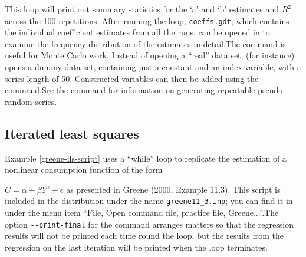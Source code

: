 This loop will print out summary statistics for the `a'
	and `b' estimates and $R^2$ across the 100 repetitions.
	After running the loop, \verb+coeffs.gdt+, which
	contains the individual coefficient estimates from all the
	runs, can be opened in  to
	examine the frequency distribution of the estimates in
	detail.The command  is useful for
	Monte Carlo work.  Instead of opening a ``real''
	data set,  (for instance) opens
	a dummy data set, containing just a constant and an index
	variable, with a series length of 50. Constructed variables
	can then be added using the 
	command.See the  command for
	information on generating repeatable pseudo-random
	series.

\subsection{Iterated least
	squares}
\label{loop-ils-examples}

Example \ref{greene-ils-script} uses a
	``while'' loop to replicate the estimation of a
	nonlinear consumption function of the form 
	
	    $C = \alpha + \beta Y^{\gamma} + \epsilon$
	   as presented in Greene (2000, Example 11.3).
	This script is included in the
	 distribution under the name
	\verb+greene11_3.inp+; you can find it in
	 under the menu item
	``File, Open command file, practice file,
	  Greene...''.The option \verb+--print-final+ for the
       command arranges matters so that the
      regression results will not be printed each time round the loop,
      but the results from the regression on the last iteration will be
      printed when the loop terminates.


